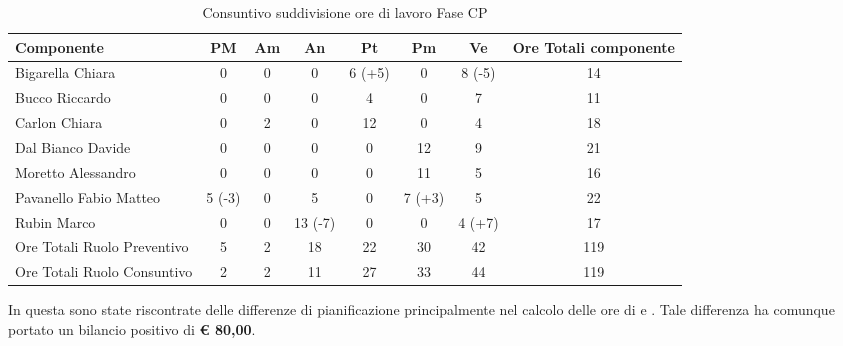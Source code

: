 			\begin{table}[H]
				\begin{center}
					\begin{tabular}{| l | c | c | c | c | c | c | c |}
						\hline
						Componente 					& PM	& Am 	& An 	& Pt 		& Pm 	& Ve 		& Ore Totali componente \\ \hline
						
						Bigarella Chiara 			& 0		& 0		& 0		& 6 (+5)		& 0		& 8 (-5)		& 14 \\
						Bucco Riccardo 				& 0		& 0		& 0		& 4 		& 0		& 7 		& 11 \\
						Carlon Chiara				& 0		& 2 	& 0		& 12 		& 0		& 4 		& 18 \\
						Dal Bianco Davide 			& 0		& 0		& 0		& 0			& 12 	& 9 		& 21 \\
						Moretto Alessandro 			& 0		& 0		& 0		& 0			& 11 	& 5			& 16 \\
						Pavanello Fabio Matteo		& 5 (-3) & 0	& 5		& 0			& 7 (+3) & 5 		& 22 \\
						Rubin Marco					& 0		& 0		& 13 (-7) & 0		& 0		& 4 (+7)	& 17 \\ \hline \hline
						
						Ore Totali Ruolo Preventivo & 5 	& 2 	& 18 	& 22 		& 30 	& 42 		& 119\\ 
						Ore Totali Ruolo Consuntivo & 2 	& 2 	& 11 	& 27 		& 33 	& 44 		& 119\\ \hline
					\end{tabular}
				\end{center}
				\caption{Consuntivo suddivisione ore di lavoro Fase CP}
			\end{table}

			In questa  sono state riscontrate delle differenze di pianificazione principalmente nel calcolo delle ore di  e . Tale differenza ha comunque portato un bilancio positivo di \textbf{\euro{} 80,00}.
	
